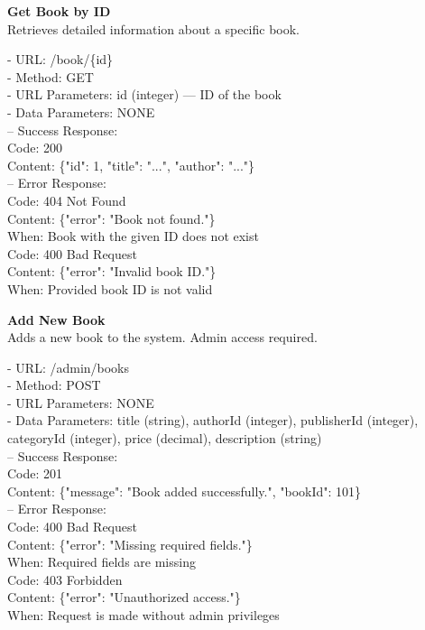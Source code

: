 \begin{flushleft}
    \textbf{Get Book by ID} \\
    Retrieves detailed information about a specific book.

    - URL: /book/\{id\} \\
    - Method: GET \\
    - URL Parameters: id (integer) — ID of the book \\
    - Data Parameters: NONE \\
    – Success Response: \\
    Code: 200 \\
    Content: \{"id": 1, "title": "...", "author": "..."\} \\
    – Error Response: \\
    Code: 404 Not Found \\
    Content: \{"error": "Book not found."\} \\
    When: Book with the given ID does not exist \\
    Code: 400 Bad Request \\
    Content: \{"error": "Invalid book ID."\} \\
    When: Provided book ID is not valid
\end{flushleft}

\begin{flushleft}
    \textbf{Add New Book} \\
    Adds a new book to the system. Admin access required.

    - URL: /admin/books \\
    - Method: POST \\
    - URL Parameters: NONE \\
    - Data Parameters: title (string), authorId (integer), publisherId (integer), categoryId (integer), price (decimal), description (string) \\
    – Success Response: \\
    Code: 201 \\
    Content: \{"message": "Book added successfully.", "bookId": 101\} \\
    – Error Response: \\
    Code: 400 Bad Request \\
    Content: \{"error": "Missing required fields."\} \\
    When: Required fields are missing \\
    Code: 403 Forbidden \\
    Content: \{"error": "Unauthorized access."\} \\
    When: Request is made without admin privileges
\end{flushleft}

